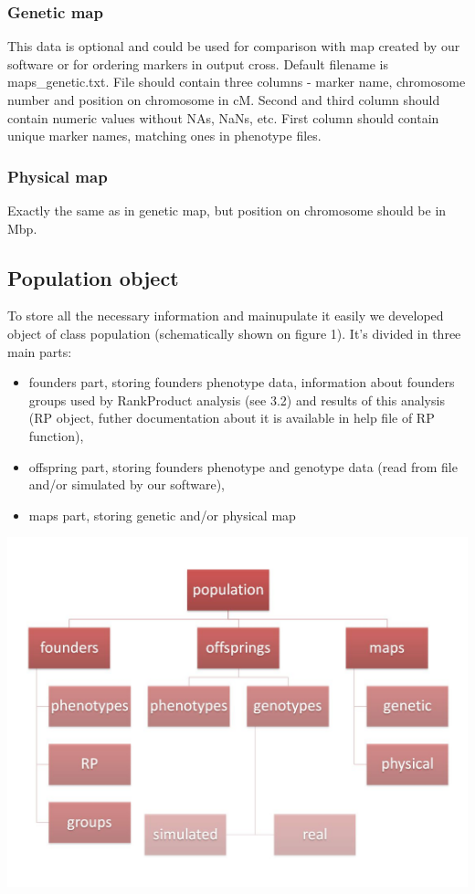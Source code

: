 \documentclass{article}
\begin{document}
\subsubsection{Genetic map}
This data is optional and could be used for comparison with map created by our software or for ordering markers in output cross. Default filename is maps\_genetic.txt. File should contain three columns - marker name, chromosome number and position on chromosome in cM. Second and third column should contain numeric values without NAs, NaNs, etc. First column should contain unique marker names, matching ones in phenotype files.
\subsubsection{Physical map}
Exactly the same as in genetic map, but position on chromosome should be in Mbp.


\subsection{Population object}
\begin{multicols}{2}
To store all the necessary information and mainupulate it easily we developed object of class population (schematically shown on figure 1). It's divided in three main parts:
\begin{itemize}
\item  founders part, storing founders phenotype data, information about founders groups used by RankProduct analysis (see 3.2) and results of this analysis (RP object, futher documentation about it is available in help file of RP function),
\item  offspring part, storing founders phenotype and genotype data (read from file and/or simulated by our software),
\item maps part, storing genetic and/or physical map
\end{itemize}
\includegraphics[scale=0.22]{population.jpg}
 \end{multicols}
\end{document}
